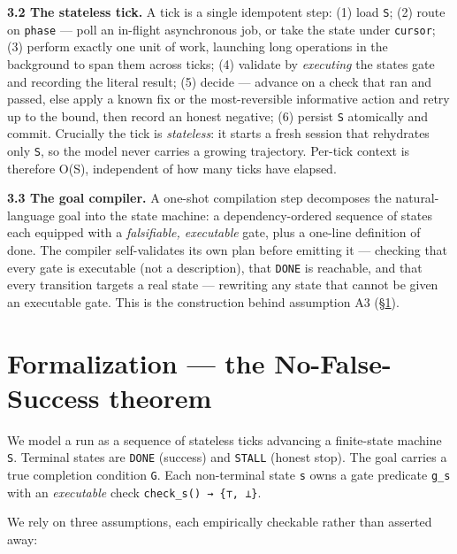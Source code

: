 \textbf{3.2 The stateless tick.} A tick is a single idempotent step: (1) load \texttt{S}; (2) route on \texttt{phase} ---
poll an in-flight asynchronous job, or take the state under \texttt{cursor}; (3) perform exactly one unit of
work, launching long operations in the background to span them across ticks; (4) validate by
\emph{executing} the state\textquotesingle s gate and recording the literal result; (5) decide --- advance on a check that
ran and passed, else apply a known fix or the most-reversible informative action and retry up to the
bound, then record an honest negative; (6) persist \texttt{S} atomically and commit. Crucially the tick is
\emph{stateless}: it starts a fresh session that rehydrates only \texttt{S}, so the model never carries a growing
trajectory. Per-tick context is therefore O(\textbar S\textbar), independent of how many ticks have elapsed.

\textbf{3.3 The goal compiler.} A one-shot compilation step decomposes the natural-language goal into the
state machine: a dependency-ordered sequence of states each equipped with a \emph{falsifiable, executable}
gate, plus a one-line definition of done. The compiler self-validates its own plan before emitting it
--- checking that every gate is executable (not a description), that \texttt{DONE} is reachable, and that every
transition targets a real state --- rewriting any state that cannot be given an executable gate. This is
the construction behind assumption A3 (\S\ref{formalization--the-no-false-success-theorem}).



\section{Formalization --- the No-False-Success theorem}\label{formalization--the-no-false-success-theorem}

We model a run as a sequence of stateless ticks advancing a finite-state machine \texttt{S}. Terminal states
are \texttt{DONE} (success) and \texttt{STALL} (honest stop). The goal carries a true completion condition \texttt{G}. Each
non-terminal state \texttt{s} owns a gate predicate \texttt{g\_s} with an \emph{executable} check \texttt{check\_s()\ →\ \{⊤,\ ⊥\}}.

We rely on three assumptions, each empirically checkable rather than asserted away:

